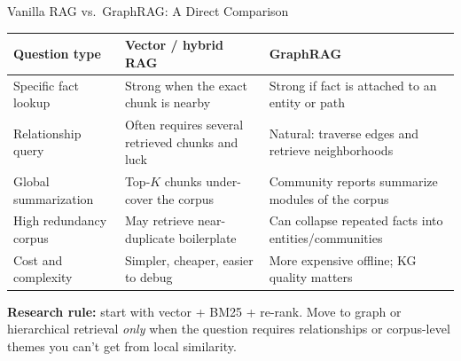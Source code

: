 \begin{frame}{Vanilla RAG vs.\ GraphRAG: A Direct Comparison}
\small
\begin{center}
\footnotesize
\begin{tabular}{|p{3.2cm}|p{4.6cm}|p{5.2cm}|}
\hline
\textbf{Question type} & \textbf{Vector / hybrid RAG} & \textbf{GraphRAG} \\ \hline
Specific fact lookup & Strong when the exact chunk is nearby & Strong if fact is attached to an entity or path \\ \hline
Relationship query & Often requires several retrieved chunks and luck & Natural: traverse edges and retrieve neighborhoods \\ \hline
Global summarization & Top-$K$ chunks under-cover the corpus & Community reports summarize modules of the corpus \\ \hline
High redundancy corpus & May retrieve near-duplicate boilerplate & Can collapse repeated facts into entities/communities \\ \hline
Cost and complexity & Simpler, cheaper, easier to debug & More expensive offline; KG quality matters \\ \hline
\end{tabular}
\end{center}

\vspace{0.15cm}
\textbf{Research rule:} start with vector + BM25 + re-rank. Move to graph or hierarchical retrieval \emph{only} when the question requires relationships or corpus-level themes you can't get from local similarity.
\end{frame}



